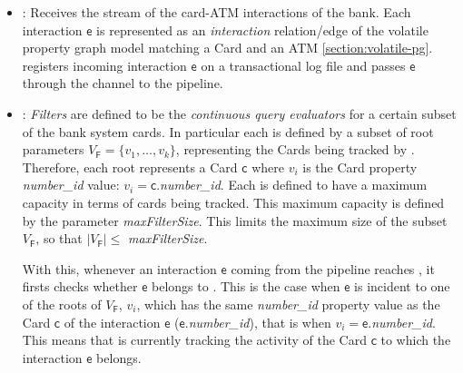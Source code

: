 \begin{itemize}
    \item \source \Sr: Receives the stream of the card-ATM interactions of the bank. Each interaction $\mathsf{e}$ is represented as an \emph{interaction} relation/edge of the volatile property graph model matching a Card and an ATM \ref{section:volatile-pg}. \Sr registers incoming interaction $\mathsf{e}$ on a transactional log file and passes $\mathsf{e}$ through the \eventch channel to the pipeline.
    \item \filter \F: \emph{Filters} are defined to be the \textit{continuous query evaluators} for a certain subset of the bank system cards. In particular each \F is defined by a subset of root parameters $V_{\mathsf{F}} = \{v_1,\ldots,v_k\}$, representing the Cards being tracked by \F. Therefore, each root represents a Card $\mathsf{c}$ where $v_i$ is the Card property \emph{number\_id} value: $v_i = \mathsf{c}$.\emph{number\_id}. Each \filter is defined to have a maximum capacity in terms of cards being tracked. This maximum capacity is defined by the parameter \emph{maxFilterSize}. This limits the maximum size of the subset $V_{\mathsf{F}}$, so that $|V_{\mathsf{F}}| \leq $ \emph{maxFilterSize}.

    With this, whenever an interaction $\mathsf{e}$ coming from the pipeline reaches \filter \F, it firsts checks whether $\mathsf{e}$ belongs to \filter \F. This is the case when $\mathsf{e}$ is incident to one of the roots of $V_{\mathsf{F}}$, $v_i$, which has the same \emph{number\_id} property value as the Card $\mathsf{c}$ of the interaction $\mathsf{e}$ ($\mathsf{e}$.\emph{number\_id}), that is when $v_i =\mathsf{e}$.\emph{number\_id}. This means that \F is currently tracking the activity of the Card $\mathsf{c}$ to which the interaction $\mathsf{e}$ belongs. 


\end{itemize}

